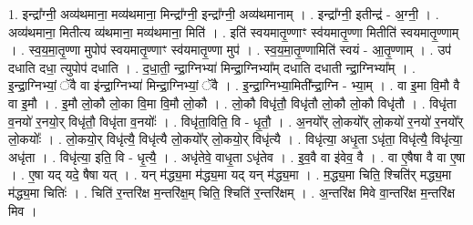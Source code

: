 \documentclass[17pt]{extarticle}
\begin{document}
1. इन्द्रा᳚ग्नी॒ अव्य॑थमाना॒ मव्य॑थमाना॒ मिन्द्रा᳚ग्नी॒ इन्द्रा᳚ग्नी॒ अव्य॑थमानाम् । . इन्द्रा᳚ग्नी॒ इतीन्द्र॑ - अ॒ग्नी॒ । . अव्य॑थमाना॒ मितीत्य व्य॑थमाना॒ मव्य॑थमाना॒ मिति॑ । . इति॑ स्वयमातृ॒ण्णाꣳ स्व॑यमातृ॒ण्णा मितीति॑ स्वयमातृ॒ण्णाम् । . स्व॒य॒मा॒तृ॒ण्णा मुपोप॑ स्वयमातृ॒ण्णाꣳ स्व॑यमातृ॒ण्णा मुप॑ । . स्व॒य॒मा॒तृ॒ण्णामिति॑ स्वयं - आ॒तृ॒ण्णाम् । . उप॑ दधाति दधा॒ त्युपोप॑ दधाति । . द॒धा॒ती॒ न्द्रा॒ग्निभ्या॑ मिन्द्रा॒ग्निभ्या᳚म् दधाति दधाती न्द्रा॒ग्निभ्या᳚म् । . इ॒न्द्रा॒ग्निभ्यां॒ ॅवै वा इ॑न्द्रा॒ग्निभ्या॑ मिन्द्रा॒ग्निभ्यां॒ ॅवै । . इ॒न्द्रा॒ग्निभ्या॒मिती᳚न्द्रा॒ग्नि - भ्या॒म् । . वा इ॒मा वि॒मौ वै वा इ॒मौ । . इ॒मौ लो॒कौ लो॒का वि॒मा वि॒मौ लो॒कौ । . लो॒कौ विधृ॑तौ॒ विधृ॑तौ लो॒कौ लो॒कौ विधृ॑तौ । . विधृ॑ता व॒नयो॑ र॒नयो॒र् विधृ॑तौ॒ विधृ॑ता व॒नयोः᳚ । . विधृ॑ता॒विति॒ वि - धृ॒तौ॒ । . अ॒नयो᳚र् लो॒कयो᳚र् लो॒कयो॑ र॒नयो॑ र॒नयो᳚र् लो॒कयोः᳚ । . लो॒कयो॒र् विधृ॑त्यै॒ विधृ॑त्यै लो॒कयो᳚र् लो॒कयो॒र् विधृ॑त्यै । . विधृ॑त्या॒ अधृ॒ता ऽधृ॑ता॒ विधृ॑त्यै॒ विधृ॑त्या॒ अधृ॑ता । . विधृ॑त्या॒ इति॒ वि - धृ॒त्यै॒ । . अधृ॑तेवे॒ वाधृ॒ता ऽधृ॑तेव । . इ॒व॒वै वा इ॑वेव॒ वै । . वा ए॒षैषा वै वा ए॒षा । . ए॒षा यद् यदे॒ षैषा यत् । . यन् म॑द्ध्य॒मा म॑द्ध्य॒मा यद् यन् म॑द्ध्य॒मा । . म॒द्ध्य॒मा चिति॒ श्चिति॑र् मद्ध्य॒मा म॑द्ध्य॒मा चितिः॑ । . चिति॑ र॒न्तरि॑क्ष म॒न्तरि॑क्ष॒म् चिति॒ श्चिति॑ र॒न्तरि॑क्षम् । . अ॒न्तरि॑क्ष मिवे वा॒न्तरि॑क्ष म॒न्तरि॑क्ष मिव । \newline
\end{document}
